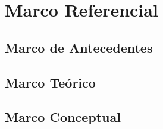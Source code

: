 \chapter{Marco Referencial}
\label{sec:marco}

\section{Marco de Antecedentes}

\section{Marco Te\'orico}

\section{Marco Conceptual}


\pagebreak